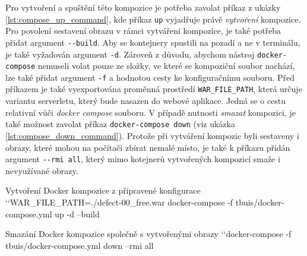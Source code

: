\documentclass[czech, ma, kiv, he, iso690alph, pdf, viewonly]{fasthesis}
\begin{document}

    Pro vytvoření a spuštění této kompozice je potřeba zavolat příkaz z ukázky \ref{lst:compose_up_command}, kde příkaz \verb|up| vyjadřuje právě \textit{vytvoření} kompozice. Pro povolení sestavení obrazu v rámci vytváření kompozice, je také potřeba přidat argument \verb|--build|. Aby se kontejnery spustili na pozadí a ne v terminálu, je také vyžadován argument \verb|-d|. Zároveň z důvodu, abychom nástroj \verb|docker-compose| nemuseli volat pouze ze složky, ve které se kompoziční soubor nachází, lze také přidat argument \verb|-f| a hodnotou cesty ke konfiguračnímu souboru. Před příkazem je také vyexportována proměnná prostředí \verb|WAR_FILE_PATH|, která určuje variantu serverletu, který bude nasazen do webové aplikace. Jedná se o cestu relativní vůči \textit{docker compose} souboru. V případě nutnosti \textit{smazat} kompozici, je také možnost zavolat příkaz \verb|docker-compose down| (viz ukázka \ref{lst:compose_down_command}). Protože při vytváření kompozic byli sestaveny i obrazy, které mohou na počítači zbírat nemalé místo, je také k příkazu přidán argument \verb|--rmi all|, který mimo kotejnerů vytvořených kompozicí smaže i nevyužívané obrazy.

    \begin{console}{Vytvoření Docker kompozice z připravené konfigurace \label{lst:compose_up_command}}
`\uxprompt`WAR_FILE_PATH=./defect-00_free.war docker-compose -f tbuis/docker-compose.yml up -d --build
    \end{console}

    \begin{console}{Smazání Docker kompozice společně s vytvořenými obrazy \label{lst:compose_down_command}}
`\uxprompt`docker-compose -f tbuis/docker-compose.yml down --rmi all
    \end{console}
\end{document}
